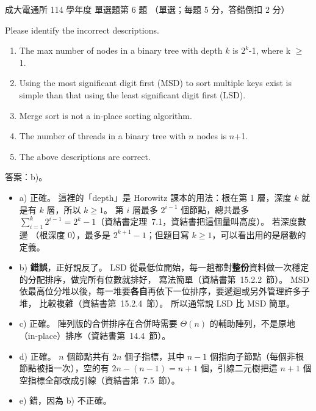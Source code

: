 \begin{pastexam}[label={px:ncku-114-cce-ds-06}]{成大電通所 114 學年度 單選題第 6 題}
（單選；每題 5 分，答錯倒扣 2 分）

Please identify the incorrect descriptions.
\begin{enumerate}[label=\alph*),nosep]
\item The max number of nodes in a binary tree with depth $k$ is $2^k$-1, where k $\ge$ 1.
\item Using the most significant digit first (MSD) to sort multiple keys exist is simple than that using the
least significant digit first (LSD).
\item Merge sort is not a in-place sorting algorithm.
\item The number of threads in a binary tree with $n$ nodes is $n$+1.
\item The above descriptions are correct.
\end{enumerate}
\end{pastexam}

\begin{pastsoln}
答案：b)。

\begin{itemize}
\item a) 正確。 這裡的「depth」是 Horowitz 課本的用法：根在第 1 層，深度 $k$ 就是有 $k$ 層，所以 $k \ge 1$。 第 $i$ 層最多
$2^{i-1}$ 個節點，總共最多 $\sum_{i=1}^{k} 2^{i-1} = 2^k - 1$（資結書定理~7.1，資結書把這個量叫高度）。 若深度數邊
（根深度 0），最多是 $2^{k+1} - 1$；但題目寫 $k \ge 1$，可以看出用的是層數的定義。
\item b) \textbf{錯誤}，正好說反了。 LSD 從最低位開始，每一趟都對\textbf{整份}資料做一次穩定的分配排序，做完所有位數就排好，
寫法簡單（資結書第~15.2.2~節）。 MSD 依最高位分堆以後，每一堆要\textbf{各自}再依下一位排序，要遞迴或另外管理許多子堆，
比較複雜（資結書第~15.2.4~節）。 所以通常說 LSD 比 MSD 簡單。
\item c) 正確。 陣列版的合併排序在合併時需要 $\Theta(n)$ 的輔助陣列，不是原地（in-place）排序（資結書第~14.4~節）。
\item d) 正確。 $n$ 個節點共有 $2n$ 個子指標，其中 $n - 1$ 個指向子節點（每個非根節點被指一次），空的有 $2n - (n - 1) = n + 1$
個，引線二元樹把這 $n + 1$ 個空指標全部改成引線（資結書第~7.5~節）。
\item e) 錯，因為 b) 不正確。
\end{itemize}
\end{pastsoln}
